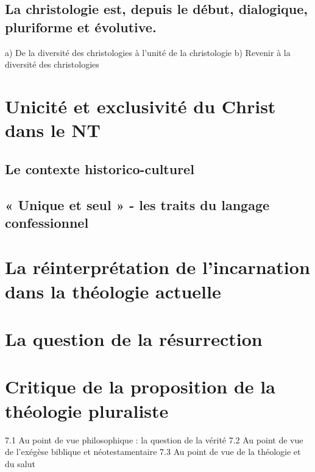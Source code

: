  
\subsection{La christologie est, depuis le début, dialogique, pluriforme et évolutive.}
 
a) De la diversité des christologies à l’unité de la christologie
b) Revenir à la diversité des christologies

\section{Unicité et exclusivité du Christ dans le NT}

\subsection{Le contexte historico-culturel} 
 
\subsection{« Unique et seul » - les traits du langage confessionnel}
 

\section{La réinterprétation de l’incarnation dans la théologie actuelle}
 

\section{La question de la résurrection}
 
\section{Critique de la proposition de la théologie pluraliste}
 
7.1 Au point de vue philosophique : la question de la vérité
7.2 Au point de vue de l’exégèse biblique et néotestamentaire
7.3 Au point de vue de la théologie et du salut